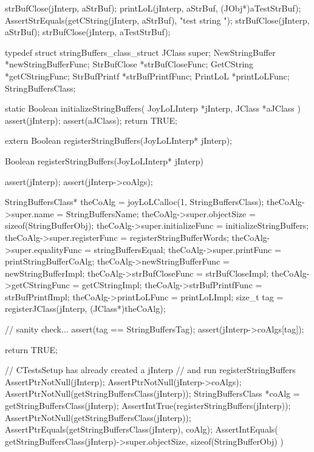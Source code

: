  strBufClose(jInterp, aStrBuf);
  printLoL(jInterp, aStrBuf, (JObj*)aTestStrBuf);
  AssertStrEquals(getCString(jInterp, aStrBuf), "test string ");
  strBufClose(jInterp, aStrBuf);
  strBufClose(jInterp, aTestStrBuf);
\stopCTest
\stopTestCase
\stopTestSuite

\startTestSuite[registerStringBuffers]

\startCHeader
typedef struct stringBuffers_class_struct {
  JClass       super;
  NewStringBuffer *newStringBufferFunc;
  StrBufClose     *strBufCloseFunc;
  GetCString      *getCStringFunc;
  StrBufPrintf    *strBufPrintfFunc;
  PrintLoL        *printLoLFunc;
} StringBuffersClass;
\stopCHeader

\startCCode
static Boolean initializeStringBuffers(
  JoyLoLInterp *jInterp,
  JClass   *aJClass
) {
  assert(jInterp);
  assert(aJClass);
  return TRUE;
}
\stopCCode

\startCHeader
extern Boolean registerStringBuffers(JoyLoLInterp* jInterp);
\stopCHeader
{}

\startCCode
Boolean registerStringBuffers(JoyLoLInterp* jInterp) {
  assert(jInterp);
  assert(jInterp->coAlgs);
  
  StringBuffersClass* theCoAlg  =
    joyLoLCalloc(1, StringBuffersClass);
  theCoAlg->super.name            = StringBuffersName;
  theCoAlg->super.objectSize      = sizeof(StringBufferObj);
  theCoAlg->super.initializeFunc  = initializeStringBuffers;
  theCoAlg->super.registerFunc    = registerStringBufferWords;
  theCoAlg->super.equalityFunc    = stringBuffersEqual;
  theCoAlg->super.printFunc       = printStringBufferCoAlg;
  theCoAlg->newStringBufferFunc   = newStringBufferImpl;
  theCoAlg->strBufCloseFunc       = strBufCloseImpl;
  theCoAlg->getCStringFunc        = getCStringImpl;
  theCoAlg->strBufPrintfFunc      = strBufPrintfImpl;
  theCoAlg->printLoLFunc          = printLoLImpl;
  size_t tag =
    registerJClass(jInterp, (JClass*)theCoAlg);
  
  // sanity check...
  assert(tag == StringBuffersTag);
  assert(jInterp->coAlgs[tag]);

  return TRUE;
}
\stopCCode


\startCTest
  // CTestsSetup has already created a jInterp
  // and run registerStringBuffers
  AssertPtrNotNull(jInterp);
  AssertPtrNotNull(jInterp->coAlgs);
  AssertPtrNotNull(getStringBuffersClass(jInterp));
  StringBuffersClass *coAlg =
    getStringBuffersClass(jInterp);
  AssertIntTrue(registerStringBuffers(jInterp));
  AssertPtrNotNull(getStringBuffersClass(jInterp));
  AssertPtrEquals(getStringBuffersClass(jInterp), coAlg);
  AssertIntEquals(
    getStringBuffersClass(jInterp)->super.objectSize,
    sizeof(StringBufferObj)
  )
\stopCTest
\stopTestCase
\stopTestSuite
